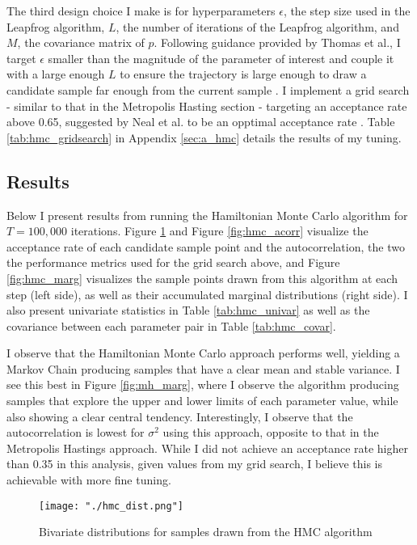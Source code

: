 \documentclass{article}
\begin{document}
The third design choice I make is for hyperparameters $\epsilon$, the step size used in the Leapfrog algorithm, $L$, the number of iterations of the Leapfrog algorithm, and $M$, the covariance matrix of $p$. Following guidance provided by Thomas et al., I target $\epsilon$ smaller than the magnitude of the parameter of interest and couple it with a large enough $L$ to ensure the trajectory is large enough to draw a candidate sample far enough from the current sample \cite{Thomas}. I implement a grid search - similar to that in the Metropolis Hasting section - targeting an acceptance rate above 0.65, suggested by Neal et al. to be an opptimal acceptance rate \cite{Neal}. Table \ref{tab:hmc_gridsearch} in Appendix \ref{sec:a_hmc} details the results of my tuning.



\subsection{Results}
Below I present results from running the Hamiltonian Monte Carlo algorithm for $T=100,000$ iterations. Figure \ref{fig:hmc_dist} and Figure \ref{fig:hmc_acorr} visualize the acceptance rate of each candidate sample point and the autocorrelation, the two the performance metrics used for the grid search above, and Figure \ref{fig:hmc_marg} visualizes the sample points drawn from this algorithm at each step (left side), as well as their accumulated marginal distributions (right side). I also present univariate statistics in Table \ref{tab:hmc_univar} as well as the covariance between each parameter pair in Table \ref{tab:hmc_covar}. 

I observe that the Hamiltonian Monte Carlo approach performs well, yielding a Markov Chain producing samples that have a clear mean and stable variance. I see this best in Figure \ref{fig:mh_marg}, where I observe the algorithm producing samples that explore the upper and lower limits of each parameter value, while also showing a clear central tendency. Interestingly, I observe that the autocorrelation is lowest for $\sigma^2$ using this approach, opposite to that in the Metropolis Hastings approach. While I did not achieve an acceptance rate higher than 0.35 in this analysis, given values from my grid search, I believe this is achievable with more fine tuning.


\begin{figure}[H]
  \centering
  \texttt{[image: "./hmc\_dist.png"]}
  \caption{\label{fig:hmc_dist} Bivariate distributions for samples drawn from the HMC algorithm}
\end{figure}
\end{document}
